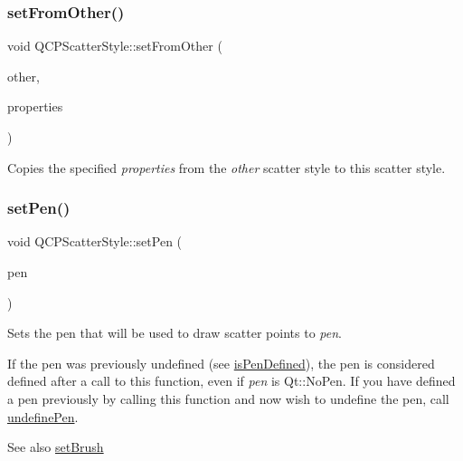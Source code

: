 \subsubsection{\texorpdfstring{setFromOther()}{setFromOther()}}
{\footnotesize\ttfamily void Q\+C\+P\+Scatter\+Style\+::set\+From\+Other (\begin{DoxyParamCaption}\item[{const \mbox{\hyperlink{class_q_c_p_scatter_style}{Q\+C\+P\+Scatter\+Style}} \&}]{other,  }\item[{Scatter\+Properties}]{properties }\end{DoxyParamCaption})}

Copies the specified {\itshape properties} from the {\itshape other} scatter style to this scatter style. \mbox{\label{class_q_c_p_scatter_style_a761f1f229cc0ca4703e1e2b89f6dd1ba}} 
\subsubsection{\texorpdfstring{setPen()}{setPen()}}
{\footnotesize\ttfamily void Q\+C\+P\+Scatter\+Style\+::set\+Pen (\begin{DoxyParamCaption}\item[{const Q\+Pen \&}]{pen }\end{DoxyParamCaption})}

Sets the pen that will be used to draw scatter points to {\itshape pen}.

If the pen was previously undefined (see \mbox{\hyperlink{class_q_c_p_scatter_style_a47077eb6450fe9a788f833e4ec1b1d5a}{is\+Pen\+Defined}}), the pen is considered defined after a call to this function, even if {\itshape pen} is {\ttfamily Qt\+::\+No\+Pen}. If you have defined a pen previously by calling this function and now wish to undefine the pen, call \mbox{\hyperlink{class_q_c_p_scatter_style_acabc2a8c83d650b946f50c3166b6c35e}{undefine\+Pen}}.

\begin{DoxySeeAlso}{See also}
\mbox{\hyperlink{class_q_c_p_scatter_style_a74d692aaeb8d4b36d6f7d510e44264b1}{set\+Brush}} 
\end{DoxySeeAlso}
\mbox{\label{class_q_c_p_scatter_style_a5fb611d46acfac520d7b89a1c71d9246}} 
